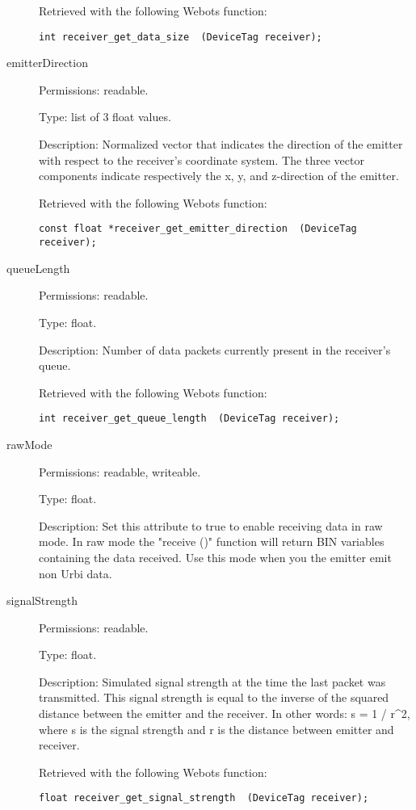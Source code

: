 \begin{description}
          Retrieved with the following Webots function:


\begin{lstlisting}[firstnumber=1,]
int receiver_get_data_size  (DeviceTag receiver);
\end{lstlisting}
\item[{         emitterDirection
 }]            Permissions: readable.


 Type: list of 3 float values.


 Description: Normalized vector that indicates the direction of the
 emitter with respect to the receiver's coordinate system. The three
 vector components indicate respectively the x, y, and z-{}direction
 of the emitter.


          Retrieved with the following Webots function:


\begin{lstlisting}[firstnumber=1,]
const float *receiver_get_emitter_direction  (DeviceTag receiver);
\end{lstlisting}
\item[{         queueLength
 }]            Permissions: readable.


 Type: float.


 Description: Number of data packets currently present in the
 receiver's queue.


          Retrieved with the following Webots function:


\begin{lstlisting}[firstnumber=1,]
int receiver_get_queue_length  (DeviceTag receiver);
\end{lstlisting}
\item[{         rawMode
 }]            Permissions: readable, writeable.


 Type: float.


 Description: Set this attribute to true to enable receiving data in
 raw mode.  In raw mode the "receive ()" function will return BIN
 variables containing the data received. Use this mode when you the
 emitter emit non Urbi data.

\item[{         signalStrength
 }]            Permissions: readable.


 Type: float.


 Description: Simulated signal strength at the time the last packet
 was transmitted.  This signal strength is equal to the inverse of the
 squared distance between the emitter and the receiver. In other
 words: s = 1 / r\^{}2, where s is the signal strength and r is the
 distance between emitter and receiver.


          Retrieved with the following Webots function:


\begin{lstlisting}[firstnumber=1,]
float receiver_get_signal_strength  (DeviceTag receiver);
\end{lstlisting}
\end{description}

